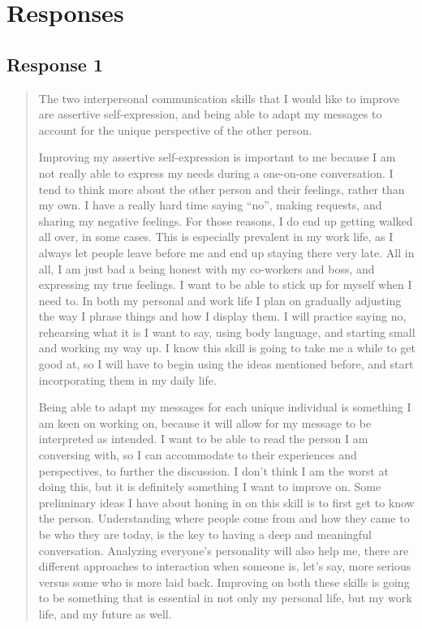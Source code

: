 
\section{Responses}
  \subsection{Response 1}
    \begin{quotation}
      The two interpersonal communication skills that I would like to improve
        are assertive self-expression, and being able to adapt my messages to
        account for the unique perspective of the other person.

      Improving my assertive self-expression is important to me because I am not
        really able to express my needs during a one-on-one conversation. I tend
        to think more about the other person and their feelings, rather than my
        own. I have a really hard time saying “no”, making requests, and sharing
        my negative feelings. For those reasons, I do end up getting walked all
        over, in some cases. This is especially prevalent in my work life, as I
        always let people leave before me and end up staying there very late.
        All in all, I am just bad a being honest with my co-workers and boss,
        and expressing my true feelings. I want to be able to stick up for
        myself when I need to. In both my personal and work life I plan on
        gradually adjusting the way I phrase things and how I display them. I
        will practice saying no, rehearsing what it is I want to say, using body
        language, and starting small and working my way up. I know this skill is
        going to take me a while to get good at, so I will have to begin using
        the ideas mentioned before, and start incorporating them in my daily
        life.

      Being able to adapt my messages for each unique individual is something I
        am keen on working on, because it will allow for my message to be
        interpreted as intended. I want to be able to read the person I am
        conversing with, so I can accommodate to their experiences and
        perspectives, to further the discussion. I don’t think I am the worst at
        doing this, but it is definitely something I want to improve on. Some
        preliminary ideas I have about honing in on this skill is to first get
        to know the person. Understanding where people come from and how they
        came to be who they are today, is the key to having a deep and
        meaningful conversation. Analyzing everyone’s personality will also help
        me, there are different approaches to interaction when someone is, let’s
        say, more serious versus some who is more laid back. Improving on both
        these skills is going to be something that is essential in not only my
        personal life, but my work life, and my future as well.
    \end{quotation}

